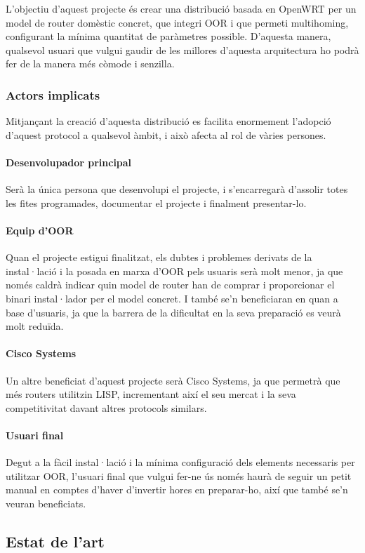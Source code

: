 \documentclass{article}
\begin{document}
L’objectiu d’aquest projecte és crear una distribució basada en OpenWRT per un model de router domèstic concret, que integri OOR i que permeti multihoming, configurant la mínima quantitat de paràmetres possible. D’aquesta manera, qualsevol usuari que vulgui gaudir de les millores d’aquesta arquitectura ho podrà fer de la manera més còmode i senzilla.

\subsubsection{Actors implicats}
Mitjançant la creació d’aquesta distribució es facilita enormement l’adopció d’aquest protocol a qualsevol àmbit, i això afecta al rol de vàries persones.
\paragraph{Desenvolupador principal}
Serà la única persona que desenvolupi el projecte, i s’encarregarà d’assolir totes les fites programades, documentar el projecte i finalment presentar-lo.
\paragraph{Equip d’OOR}
Quan el projecte estigui finalitzat, els dubtes i problemes derivats de la instal·lació i la posada en marxa d’OOR pels usuaris serà molt menor, ja que només caldrà indicar quin model de router han de comprar i proporcionar el binari instal·lador per el model concret. I també se’n beneficiaran en quan a base d’usuaris,  ja que la barrera de la dificultat en la seva preparació es veurà molt reduïda.
\paragraph{Cisco Systems}
Un altre beneficiat d’aquest projecte serà Cisco Systems, ja que permetrà que més routers utilitzin LISP, incrementant així el seu mercat i la seva competitivitat davant altres protocols similars.
\paragraph{Usuari final}
Degut a la fàcil instal·lació i la mínima configuració dels elements necessaris per utilitzar OOR, l’usuari final que vulgui fer-ne ús només haurà de seguir un petit manual en comptes d’haver d’invertir hores en preparar-ho, així que també se’n veuran beneficiats.

\subsection{Estat de l'art}
\end{document}
